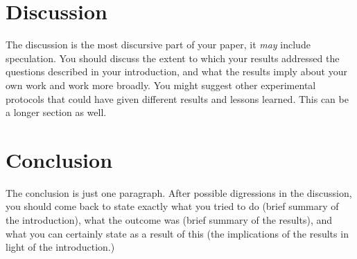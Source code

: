 \documentclass[a4paper,12pt]{article}
\begin{document}
\section{Discussion}

The discussion is the most discursive part of your paper, it {\em may}
include speculation. You should discuss the extent to which your
results addressed the questions described in your introduction, and
what the results imply about your own work and work more broadly.  You
might suggest other experimental protocols that could have given
different results and lessons learned.  This can be a longer section
as well.

\section{Conclusion}
The conclusion is just one paragraph.  After possible digressions in
the discussion, you should come back to state exactly what you tried
to do (brief summary of the introduction), what the outcome was (brief
summary of the results), and what you can certainly state as a
result of this (the implications of the results in light of the introduction.)

%
%
\printbibliography
\end{document}

